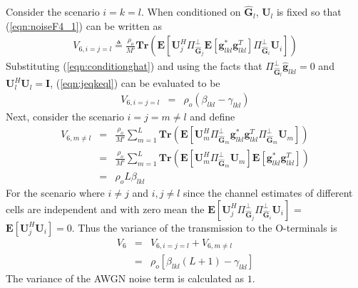 \documentclass[10pt, a4paper, twoside,fleqn]{article}
\begin{document}
Consider the scenario $i=k=l$. When conditioned on $\pmb{\hat G}_l$, $\pmb{U}_l$ is fixed so that
(\ref{eqn:noiseF4_1}) can be written as 
\begin{eqnarray}\label{eqn:jeqkeql}
   V_{6,i=j=l} \triangleq \frac{\rho_o}{M'}\pmb{Tr}\left(\pmb{E}\left[\pmb{U}_j^H \Pi^{\perp}_{\pmb{\widehat{G}}_j} \pmb{E}[\pmb{g}_{lkl}^* \pmb{g}_{lkl}^{T}]\Pi^{\perp}_{\pmb{\hat G}_i} \pmb{U}_i \right]\right)
\end{eqnarray}
Substituting (\ref{eqn:conditionghat}) and using the facts that $\Pi^{\perp}_{\pmb{\hat G}_l}\pmb{\hat g}_{lkl} = 0$ and $\pmb{U}_l^H\pmb{U}_l=\pmb{I}$, (\ref{eqn:jeqkeql}) can be evaluated to be
\begin{eqnarray}\label{eqn:v6l}
V_{6,i=j=l} &=& \rho_o(\beta_{lkl} - \gamma_{lkl})
\end{eqnarray}
Next, consider the scenario $i=j=m\neq l$ and define
\begin{eqnarray}\label{eqn:v6m}
    V_{6,m\neq l}   &=& \frac{\rho_o}{M'}\sum_{m=1}^{L} \pmb{Tr}\left(\pmb{E}\left[\pmb{U}_m^H \Pi^{\perp}_{\pmb{\widehat{G}}_m} \pmb{g}_{lkl}^* \pmb{g}_{lkl}^{T}\Pi^{\perp}_{\pmb{\hat G}_m} \pmb{U}_m \right]\right) \nonumber \\
                    &=&  \frac{\rho_o}{M'}\sum_{m=1}^{L} \pmb{Tr}\left(\pmb{E}\left[\pmb{U}_m^H \Pi^{\perp}_{\pmb{\widehat{G}}_m} \pmb{U}_m\right] \pmb{E}\left[ \pmb{g}_{lkl}^* \pmb{g}_{lkl}^{T} \right]\right) \nonumber \\
                    &=& \rho_oL\beta_{lkl}
\end{eqnarray}
For the scenario where $i\neq j$ and $i,j \neq l$ since the channel estimates of different cells are independent and with zero mean the $\pmb{E}\left[\pmb{U}_j^H\Pi^{\perp}_{\pmb{\widehat{G}}_j}\Pi^{\perp}_{\pmb{\widehat{G}}_i} \pmb{U}_i\right]$ = $\pmb{E}[\pmb{U}_j^H\pmb{U}_i] =0$. Thus the variance of the transmission to the O-terminals is
\begin{eqnarray}\label{eqn:v6}
   V_6 &=& V_{6,i=j=l} + V_{6,m\neq l} \nonumber \\
       &=& \rho_o[\beta_{lkl}(L+1)-\gamma_{lkl}]
\end{eqnarray}
The variance of the AWGN noise term is calculated as $1$.
\end{document}
